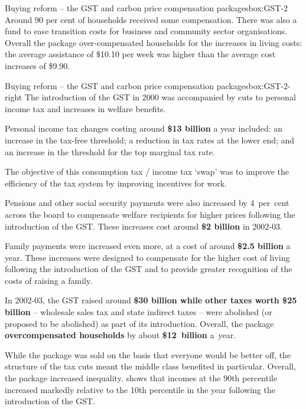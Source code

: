 {\begin{lultrabox}{Buying reform -- the GST and carbon price compensation packages}{box:GST-2}
Around 90 per cent of households received some compensation. There was also a fund to ease transition costs for business and community sector organisations. Overall the package over-compensated households for the increases in living costs: the average assistance of \$10.10 per week was higher than the average cost increases of \$9.90. 


\end{lultrabox}
\begin{rultrabox}{Buying reform -- the GST and carbon price compensation packages}{box:GST-2-right}
The introduction of the GST in 2000 was accompanied by cuts to personal income tax and increases in welfare benefits.

Personal income tax changes costing around \textbf{\$13 billion} a year included: an increase in the tax-free threshold; a reduction in tax rates at the lower end; and an increase in the threshold for the top marginal tax rate. 

The objective of this consumption tax / income tax ‘swap’ was to improve the efficiency of the tax system by improving incentives for work.

Pensions and other social security payments were also increased by 4~per~cent across the board to compensate welfare recipients for higher prices following the introduction of the GST. These increases cost around \textbf{\$2 billion} in 2002-03. 

Family payments were increased even more, at a cost of around \textbf{\$2.5 billion} a year. These increases were designed to compensate for the higher cost of living following the introduction of the GST and to provide greater recognition of the costs of raising a family. 

In 2002-03, the GST raised around \textbf{\$30 billion while other taxes worth \$25 billion} – wholesale sales tax and state indirect taxes – were abolished (or proposed to be abolished) as part of its introduction. Overall, the package \textbf{overcompensated households} by about \textbf{\$12~billion} a~year.

While the package was sold on the basis that everyone would be better off, the structure of the tax cuts meant the middle class benefited in particular. Overall, the package increased inequality. \textcite{Saunders2004} shows that incomes at the 90th percentile increased markedly relative to the 10th percentile in the year following the introduction of the GST.


\end{rultrabox}}
